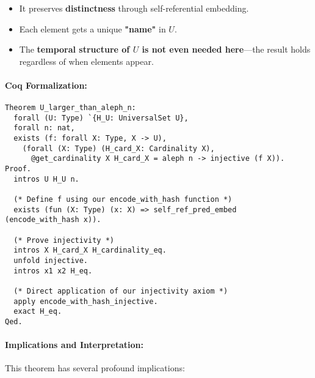 \documentclass[12pt]{article}
\begin{document}
\begin{itemize}
    \item It preserves \textbf{distinctness} through self-referential embedding.
    \item Each element gets a unique \textbf{"name"} in \( U \).
    \item The \textbf{temporal structure of \( U \) is not even needed here}—the result holds regardless of when elements appear.
\end{itemize}

\paragraph{Coq Formalization:}
\begin{lstlisting}[language=Coq]
Theorem U_larger_than_aleph_n:
  forall (U: Type) `{H_U: UniversalSet U},
  forall n: nat,
  exists (f: forall X: Type, X -> U),
    (forall (X: Type) (H_card_X: Cardinality X), 
      @get_cardinality X H_card_X = aleph n -> injective (f X)).
Proof.
  intros U H_U n.
  
  (* Define f using our encode_with_hash function *)
  exists (fun (X: Type) (x: X) => self_ref_pred_embed (encode_with_hash x)).
  
  (* Prove injectivity *)
  intros X H_card_X H_cardinality_eq.
  unfold injective.
  intros x1 x2 H_eq.
  
  (* Direct application of our injectivity axiom *)
  apply encode_with_hash_injective.
  exact H_eq.
Qed.
\end{lstlisting}

\paragraph{Implications and Interpretation:}
This theorem has several profound implications:
\end{document}
